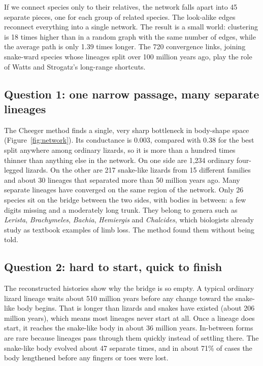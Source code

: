 \documentclass[11pt]{article}
\begin{document}
If we connect species only to their relatives, the network falls apart into 45 separate pieces, one for each group of related species. The look-alike edges reconnect everything into a single network. The result is a small world: clustering is 18 times higher than in a random graph with the same number of edges, while the average path is only 1.39 times longer. The 720 convergence links, joining snake-ward species whose lineages split over 100 million years ago, play the role of Watts and Strogatz's long-range shortcuts.

\subsection{Question 1: one narrow passage, many separate lineages}

The Cheeger method finds a single, very sharp bottleneck in body-shape space (Figure~\ref{fig:network}). Its conductance is 0.003, compared with 0.38 for the best split anywhere among ordinary lizards, so it is more than a hundred times thinner than anything else in the network. On one side are 1,234 ordinary four-legged lizards. On the other are 217 snake-like lizards from 15 different families and about 30 lineages that separated more than 50 million years ago. Many separate lineages have converged on the same region of the network. Only 26 species sit on the bridge between the two sides, with bodies in between: a few digits missing and a moderately long trunk. They belong to genera such as \emph{Lerista}, \emph{Brachymeles}, \emph{Bachia}, \emph{Hemiergis} and \emph{Chalcides}, which biologists already study as textbook examples of limb loss. The method found them without being told.

\subsection{Question 2: hard to start, quick to finish}

The reconstructed histories show why the bridge is so empty. A typical ordinary lizard lineage waits about 510 million years before any change toward the snake-like body begins. That is longer than lizards and snakes have existed (about 206 million years), which means most lineages never start at all. Once a lineage does start, it reaches the snake-like body in about 36 million years. In-between forms are rare because lineages pass through them quickly instead of settling there. The snake-like body evolved about 47 separate times, and in about 71\% of cases the body lengthened before any fingers or toes were lost.
\end{document}
